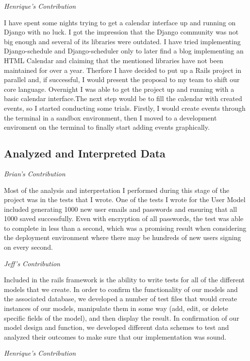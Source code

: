 \documentclass[11pt]{article}
\begin{document}
\textit{Henrique's Contribution}

I have spent some nights trying to get a calendar interface up and running on Django with no luck. I got the impression that the Django community was not big enough and several of its libraries were outdated. I have tried implementing Django-schedule and Django-scheduler only to later find a blog implementing an HTML Calendar and claiming that the mentioned libraries have not been maintained for over a year. Therfore I have decided to put up a Rails project in parallel and, if successful, I would present the proposal to my team to shift our core language. Overnight I was able to get the project up and running with a basic calendar interface.The next step would be to fill the calendar with created events, so I started conducting some trials. Firstly, I would create events through the terminal in a sandbox environment, then I moved to a development enviroment on the terminal to finally start adding events graphically.

\subsection{Analyzed and Interpreted Data}

\textit{Brian's Contribution}

Most of the analysis and interpretation I performed during this stage of the project was in the tests that I wrote. One of the tests I wrote for the User Model included generating 1000 new user emails and passwords and ensuring that all 1000 saved successfully. Even with encryption of all passwords, the test was able to complete in less than a second, which was a promising result when considering the deployment environment where there may be hundreds of new users signing on every second. 

\textit{Jeff's Contribution}

Included in the rails framework is the ability to write tests for all of the different models that we create.  In order to confirm the functionality of our models and the associated database, we developed a number of test files that would create instances of our models, manipulate them in some way (add, edit, or delete specific fields of the model), and then display the result.  In confirmation of our model design and function, we developed different data schemes to test and analyzed their outcomes to make sure that our implementation was sound.

\textit{Henrique's Contribution}
\end{document}
